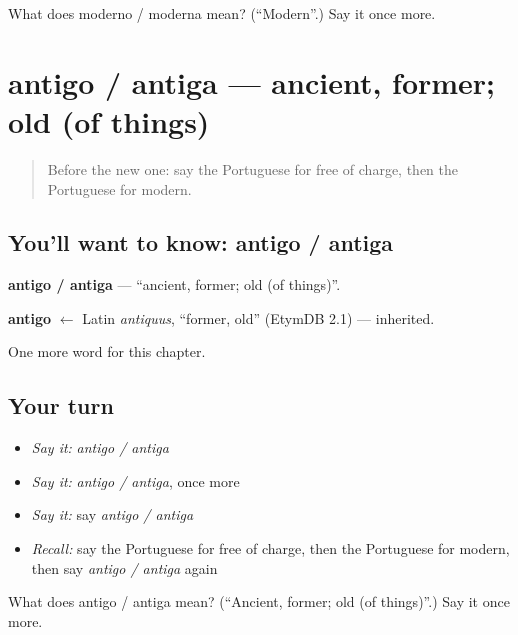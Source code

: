 \begin{tcolorbox}[breakable,colback=teal!4,colframe=teal!35!black,title={Before you move on}]
What does moderno / moderna mean? (\textquotedblleft{}Modern\textquotedblright{}.) Say it once more.
\end{tcolorbox}
\section[antigo / antiga]{antigo / antiga — ancient, former; old (of things)}

\label{lesson:PT-C216-antigo-antiga}



\begin{quote}
Before the new one: say the Portuguese for free of charge, then the Portuguese for modern.
\end{quote}

\subsection*{You'll want to know: antigo / antiga}
\textbf{antigo / antiga} — \textquotedblleft{}ancient, former; old (of things)\textquotedblright{}.

\begin{cousinweb}
\textbf{antigo} $\leftarrow$ Latin \emph{antiquus}, \textquotedblleft{}former, old\textquotedblright{} (EtymDB 2.1) — inherited.
\end{cousinweb}

\begin{grammarlens}[title={What you've built}]
One more word for this chapter.
\end{grammarlens}

\subsection*{Your turn}
\begin{itemize}
\raggedright
  \item \emph{Say it:} \emph{antigo / antiga}
  \item \emph{Say it:} \emph{antigo / antiga}, once more
  \item \emph{Say it:} say \emph{antigo / antiga}
  \item \emph{Recall:} say the Portuguese for free of charge, then the Portuguese for modern, then say \emph{antigo / antiga} again
\end{itemize}

\begin{tcolorbox}[breakable,colback=teal!4,colframe=teal!35!black,title={Before you move on}]
What does antigo / antiga mean? (\textquotedblleft{}Ancient, former; old (of things)\textquotedblright{}.) Say it once more.
\end{tcolorbox}
